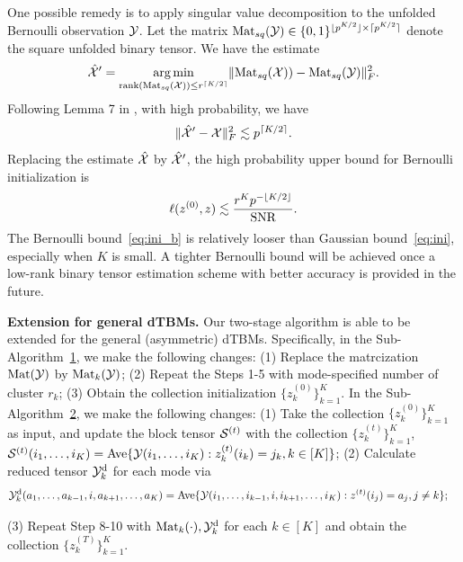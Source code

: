 \documentclass[lettersize,onecolumn,journal]{IEEEtran}
\theoremstyle{definition}
\theoremstyle{definition}
\DeclarePairedDelimiter{\ceil}{\lceil}{\rceil}
\DeclarePairedDelimiter{\floor}{\lfloor}{\rfloor}
\begin{document}
{One possible remedy is to apply singular value decomposition to the unfolded Bernoulli observation $\mathcal{Y}$. Let the matrix $\mat_{sq} (\tY) \in \{0,1\}^{\floor{p^{K/2}} \times \ceil{p^{K/2}} }$ denote the square unfolded binary tensor. We have the estimate 
\begin{equation}
    \hat \tX' = \argmin_{\text{rank}(\mat_{sq}(\tX)) \leq r^{\ceil{K/2}}} \onormSize{}{ \mat_{sq}(\tX)) -  \mat_{sq}(\tY)}_F^2.
\end{equation}
Following Lemma 7 in \cite{gao2018community}, with high probability, we have
\begin{equation}
    \onormSize{}{\hat \tX' - \tX}_F^2 \lesssim p^{\ceil{K/2}}.
\end{equation} 
Replacing the estimate $\hat {\mathcal{X}}$ by $\hat {\mathcal{X}}'$, the high probability upper bound for Bernoulli initialization is
\begin{equation}\label{eq:ini_b}
    \ell(z^{(0)}, z) \lesssim \frac{r^K p^{- \floor{K/2} }}{\text{SNR}}. 
\end{equation}
The Bernoulli bound~\eqref{eq:ini_b} is relatively looser than Gaussian bound~\eqref{eq:ini}, especially when $K$ is small. A tighter Bernoulli bound will be achieved once a low-rank binary tensor estimation scheme with better accuracy is provided in the future.


{\bf Extension for general dTBMs.}
Our two-stage algorithm is able to be extended for the general (asymmetric) dTBMs. Specifically, in the Sub-Algorithm~\hyperref[alg:main]{1}, we make the following changes: (1)
Replace the matrcization $\text{Mat}(\mathcal{Y})$ by $\text{Mat}_k(\mathcal{Y})$; (2) Repeat the Steps 1-5 with mode-specified number of cluster $r_k$; (3) Obtain the collection initialization $ \{z^{(0)}_k\}_{k=1}^K$. In the Sub-Algorithm~\hyperref[alg:main]{2}, we make the following changes: (1) Take the collection $\{z^{(0)}_k\}_{k=1}^K$ as input, and update the block tensor $\mathcal{S}^{(t)}$ with the collection $\{ z_k^{(t)}\}_{k=1}^K$, $
        \mathcal{S}^{(t)}(i_1,\ldots, i_K) =  \text{Ave} \{\mathcal{Y}(i_1,\ldots,i_K): z^{(t)}_k(i_k) = j_k, k \in [K]\}$;
(2) Calculate reduced tensor $\mathcal{Y}^{\text{d}}_k$ for each mode via
\begin{align}
    &\mathcal{Y}^{\text{d}}_k(a_1,\ldots,a_{k-1}, i ,a_{k+1},\ldots,a_K) 
    = \text{Ave}\{\mathcal{Y}(i_1,\ldots,i_{k-1},i,i_{k+1},\ldots,i_K): z^{(t)}(i_j) = a_j, j \neq k \}; 
\end{align}

(3) Repeat Step 8-10 with $\text{Mat}_k(\cdot), \mathcal{Y}_k^{\text{d}}$ for each $k \in [K]$ and obtain the collection $\{z^{(T)}_k\}_{k=1}^K$. 

}
\end{document}
